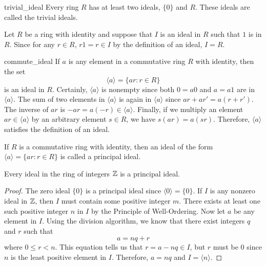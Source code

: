  
\begin{example}{trivial_ideal}
Every ring $R$ has at least two ideals, $\{ 0 \}$ and $R$.  These
ideals are called the {\bfi trivial ideals}. 
\end{example}
 
 

 
 
Let $R$ be a ring with identity and suppose that $I$ is an ideal in
$R$ such that $1$ is in $R$. Since for any $r \in R$, $r1 = r \in 
I$ by the definition of an ideal, $I = R$.
 
 
\begin{example}{commute_ideal}
If $a$ is any element in a commutative ring $R$ with identity, then
the set   
\[
\langle a \rangle = \{ ar : r \in R \}
\]
is an ideal in $R$. Certainly, $\langle a \rangle$ is nonempty since both
$0 = a0$ and $a = a1$ are in $\langle a \rangle$. The
sum of two elements in $\langle a \rangle$ is again in $\langle a
\rangle$ since $ar + ar' =  a(r + r')$. The inverse of $ar$ is $-ar =
a (-r) \in \langle a \rangle$.  Finally, if we multiply an element $ar
\in \langle a \rangle$ by an arbitrary element $s \in R$, we have
$s(ar) = a(sr)$.  Therefore, $\langle a \rangle$ satisfies the
definition of an ideal. 
\end{example}
 
 

 
 
If $R$ is a commutative ring with identity, then an ideal of the form
$\langle a \rangle  = \{ ar : r \in R \}$  is called a {\bfi principal
ideal}.  
 
 
\begin{theorem}
Every ideal in the ring of integers ${\Bbb Z}$ is a principal ideal.
\end{theorem}
 
 
\begin{proof}
The zero ideal $\{ 0 \}$ is a principal ideal since $\langle 0
\rangle = \{ 0 \}$. If  $I$ is any nonzero ideal in ${\Bbb Z}$, then 
$I$ must contain some positive integer $m$.  There exists at least one
such positive integer $n$ in $I$ by the Principle of Well-Ordering. 
Now let $a$ be any element in $I$. Using the division algorithm, we 
know that there exist integers $q$ and $r$ such that 
\[
a = nq + r
\]
where $0 \leq r < n$. This equation tells us that $r = a - nq \in I$,
but $r$ must be $0$ since $n$ is the least positive element in $I$.
Therefore, $a = nq$ and $I = \langle n \rangle$.
\mbox{\hspace*{1in}}
\end{proof}
 
